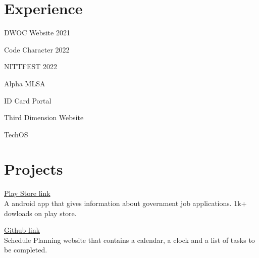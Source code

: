 \documentclass[]{deedy-resume-openfont}
\begin{document}
\hfill
\begin{minipage}[t]{0.66\textwidth} 

%
%
\section{Experience}
\hfill {}
\begin{tightemize}
	\item DWOC Website 2021
	\item Code Character 2022
	\item NITTFEST 2022
\end{tightemize}
\sectionsep
{}\hfill {}
\begin{tightemize}
	\item Alpha MLSA
\end{tightemize}
\sectionsep
{}\hfill {}
\begin{tightemize}
	\item ID Card Portal
	\item Third Dimension Website
	\item TechOS
\end{tightemize}
\sectionsep
%
%
\section{Projects}
\raggedright

\hfill \href{https://play.google.com/store/apps/details?id=com.amostrone.akash.sanjeevwebsolutions}{Play Store link}\\
A android app that gives information about government job applications. 1k+ dowloads on play store.\\
\sectionsep
  

\hfill \href{https://github.com/jaiakash/PlanitRight}{Github link}\\
Schedule Planning website that contains a calendar, a clock and a list of tasks to be completed.\\
\sectionsep
  


\end{minipage}
\end{document}
